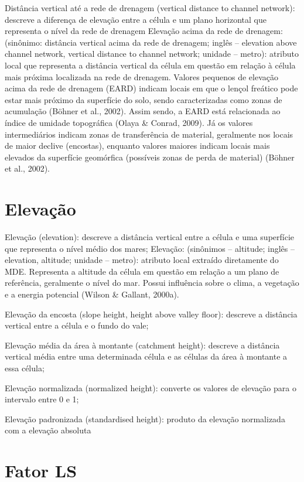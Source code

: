 \documentclass[]{book}
\begin{document}
Distância vertical até a rede de drenagem (vertical distance to channel
network): descreve a diferença de elevação entre a célula e um plano
horizontal que representa o nível da rede de drenagem Elevação acima da
rede de drenagem: (sinônimo: distância vertical acima da rede de
drenagem; inglês -- elevation above channel network, vertical distance
to channel network; unidade -- metro): atributo local que representa a
distância vertical da célula em questão em relação à célula mais próxima
localizada na rede de drenagem. Valores pequenos de elevação acima da
rede de drenagem (EARD) indicam locais em que o lençol freático pode
estar mais próximo da superfície do solo, sendo caracterizadas como
zonas de acumulação (Böhner et al., 2002). Assim sendo, a EARD está
relacionada ao índice de umidade topográfica (Olaya \& Conrad, 2009). Já
os valores intermediários indicam zonas de transferência de material,
geralmente nos locais de maior declive (encostas), enquanto valores
maiores indicam locais mais elevados da superfície geomórfica (possíveis
zonas de perda de material) (Böhner et al., 2002).

\section{Elevação}\label{elevacao}

Elevação (elevation): descreve a distância vertical entre a célula e uma
superfície que representa o nível médio dos mares; Elevação: (sinônimos
-- altitude; inglês -- elevation, altitude; unidade -- metro): atributo
local extraído diretamente do MDE. Representa a altitude da célula em
questão em relação a um plano de referência, geralmente o nível do mar.
Possui influência sobre o clima, a vegetação e a energia potencial
(Wilson \& Gallant, 2000a).

Elevação da encosta (slope height, height above valley ﬂoor): descreve a
distância vertical entre a célula e o fundo do vale;

Elevação média da área à montante (catchment height): descreve a
distância vertical média entre uma determinada célula e as células da
área à montante a essa célula;

Elevação normalizada (normalized height): converte os valores de
elevação para o intervalo entre 0 e 1;

Elevação padronizada (standardised height): produto da elevação
normalizada com a elevação absoluta

\section{Fator LS}\label{fator-ls}
\end{document}
